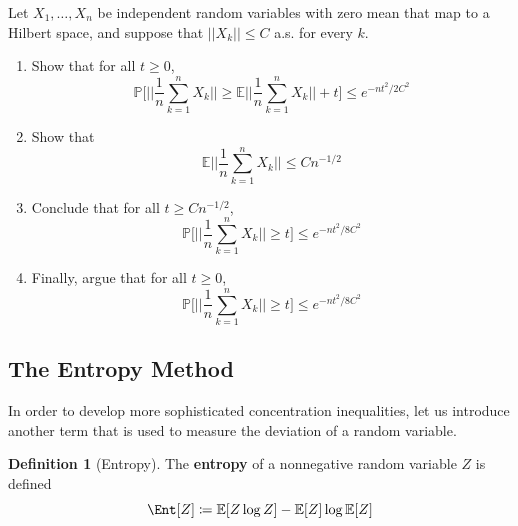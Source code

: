 \documentclass{article}
\theoremstyle{definition}
\theoremstyle{remark}
\theoremstyle{definition}
\newtheorem{definition}{Definition}[section]
\begin{document}
  \begin{exercise}
  Let $X_1, \ldots, X_n$ be independent random variables with zero mean that map to a Hilbert space, and suppose that $||X_k|| \leq C$ a.s. for every $k$. 
  \begin{enumerate}
      \item Show that for all $t \geq 0$, 
      \[\mathbb{P} \bigg[ \bigg| \bigg| \frac{1}{n} \sum_{k=1}^n X_k \bigg| \bigg| \geq \mathbb{E} \bigg| \bigg| \frac{1}{n} \sum_{k=1}^n X_k \bigg| \bigg| + t \bigg] \leq e^{-nt^2 / 2C^2} \]
      
      \item Show that 
      \[\mathbb{E} \bigg| \bigg| \frac{1}{n} \sum_{k=1}^n X_k \bigg| \bigg| \leq C n^{-1/2}\]
      
      \item Conclude that for all $t \geq C n^{-1/2}$, 
      \[\mathbb{P} \bigg[ \bigg| \bigg| \frac{1}{n} \sum_{k=1}^n X_k \bigg| \bigg| \geq t \bigg] \leq e^{-nt^2 / 8C^2}\]
      
      \item Finally, argue that for all $t \geq 0$, 
      \[\mathbb{P} \bigg[ \bigg| \bigg| \frac{1}{n} \sum_{k=1}^n X_k \bigg| \bigg| \geq t \bigg] \leq e^{-nt^2 / 8C^2}\]
  \end{enumerate}
  \end{exercise}

  \subsection{The Entropy Method}

  In order to develop more sophisticated concentration inequalities, let us introduce another term that is used to measure the deviation of a random variable. 

  \begin{definition}[Entropy]
  The \textbf{entropy} of a nonnegative random variable $Z$ is defined 
  \[\Ent[Z] \coloneqq \mathbb{E}[Z \log Z] - \mathbb{E}[Z] \log \mathbb{E}[Z]\]
  \end{definition}
\end{document}
